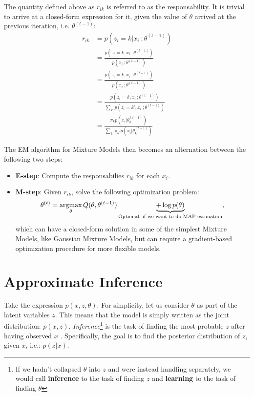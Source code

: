 The quantity defined above as $r_{ik}$ is referred to as the responsability. It
is trivial to arrive at a closed-form expression for it, given the value of $\theta$
arrived at the previous iteration, i.e. $\theta^{(t-1)}$:
\begin{align}
    r_{ik} &= p(z_i = k | x_i\ ; \theta^{(t-1)}) \\
    &= \frac{p(z_i = k , x_i\ ; \theta^{(t-1)})}{p(x_i\ ; \theta^{(t-1)})} \\
    &= \frac{p(z_i = k , x_i\ ; \theta^{(t-1)})}{p(x_i\ ; \theta^{(t-1)})} \\
    &= \frac{p(z_i = k , x_i\ ; \theta^{(t-1)})}{\sum_{k'} p(z_i = k' , x_i\ ; \theta^{(t-1)})} \\
    &= \frac{\pi_k p(x_i | \theta_k^{(t-1)})}{\sum_{k'} \pi_{k'} p(x_i | \theta_{k'}^{(t-1)})}
\end{align}



The EM algorithm for Mixture Models then becomes an alternation between the
following two steps:
\begin{itemize}
    \item \textbf{E-step}: Compute the responsabilies $r_{ik}$ for each $x_i$.
    \item \textbf{M-step}: Given $r_{ik}$, solve the following optimization
        problem:
        \begin{align}
            \theta^{(t)} = \operatorname*{\arg\!\max}_\theta Q(\theta, \theta^{(t-1)})
                \underbrace{+ \log p(\theta)}_\text{Optional, if we want to do MAP estimation},
        \end{align} which can have a closed-form solution in some of the simplest Mixture Models,
        like Gaussian Mixture Models, but can require a gradient-based optimization procedure for
        more flexible models.
\end{itemize}

\section{Approximate Inference}
\label{section:probmodelinf}
Take the expression $p(x, z, \theta)$. For simplicity, let us consider $\theta$
as part of the latent variables $z$. This means that the model is simply written
as the joint distribution: $p(x, z)$. \emph{Inference}\footnote{If we hadn't collapsed
$\theta$ into $z$ and were instead handling separately, we would call \textbf{inference}
to the task of finding $z$ and \textbf{learning} to the task of finding $\theta$}
is the task of finding the most probable $z$ after having observed $x$ . Specifically,
the goal is to find the posterior distribution of $z$, given $x$, i.e.: $p(z|x)$.

